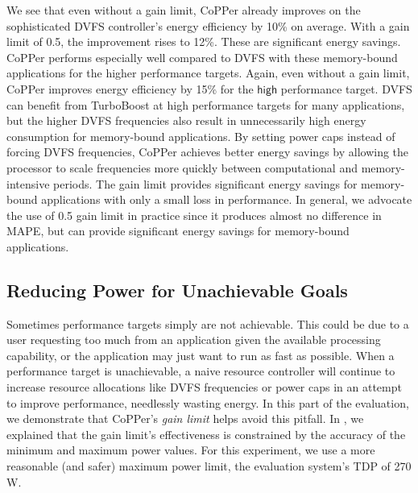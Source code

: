 We see that even without a gain limit, CoPPer already improves on the sophisticated DVFS controller's energy efficiency by 10\% on average.
With a gain limit of 0.5, the improvement rises to 12\%.
These are significant energy savings.
CoPPer performs especially well compared to DVFS with these memory-bound applications for the higher performance targets.
Again, even without a gain limit, CoPPer improves energy efficiency by 15\% for the $\mathsf{high}$ performance target.
DVFS can benefit from TurboBoost at high performance targets for many applications, but the higher DVFS frequencies also result in unnecessarily high energy consumption for memory-bound applications.
By setting power caps instead of forcing DVFS frequencies, CoPPer achieves better energy savings by allowing the processor to scale frequencies more quickly between computational and memory-intensive periods.
The gain limit provides significant energy savings for memory-bound applications with only a small loss in performance.
In general, we advocate the use of 0.5 gain limit in practice since it produces almost no difference in MAPE, but can provide significant energy savings for memory-bound applications.


\subsection{Reducing Power for Unachievable Goals}
\label{sec:copper-eval-impossible}

Sometimes performance targets simply are not achievable.
This could be due to a user requesting too much from an application given the available processing capability, or the application may just want to run as fast as possible.
When a performance target is unachievable, a naive resource controller will continue to increase resource allocations like DVFS frequencies or power caps in an attempt to improve performance, needlessly wasting energy.
In this part of the evaluation, we demonstrate that CoPPer's \emph{gain limit} helps avoid this pitfall.
In , we explained that the gain limit's effectiveness is constrained by the accuracy of the minimum and maximum power values.
For this experiment, we use a more reasonable (and safer) maximum power limit, the evaluation system's TDP of 270 W.

